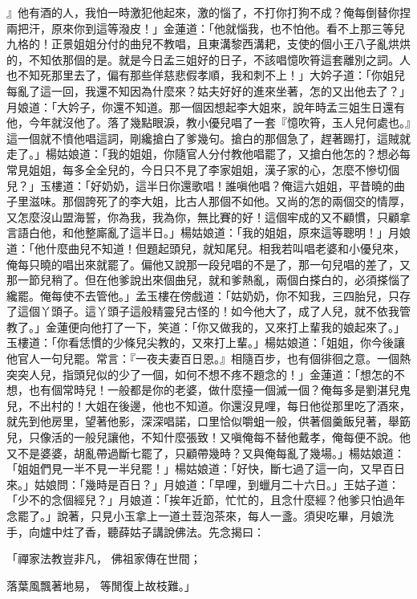 \begin{showcontents}{}
』他有酒的人，我怕一時激犯他起來，激的惱了，不打你打狗不成？俺每倒替你捏兩把汗，原來你到這等潑皮！」金蓮道：「他就惱我，也不怕他。看不上那三等兒九格的！正景姐姐分付的曲兒不教唱，且東溝黎西溝耙，支使的個小王八子亂烘烘的，不知依那個的是。就是今日孟三姐好的日子，不該唱憶吹筲這套離別之詞。人也不知死那里去了，偏有那些佯慈悲假孝順，我和刺不上！」大妗子道：「你姐兒每亂了這一回，我還不知因為什麼來？姑夫好好的進來坐著，怎的又出他去了？」月娘道：「大妗子，你還不知道。那一個因想起李大姐來，說年時孟三姐生日還有他，今年就沒他了。落了幾點眼淚，教小優兒唱了一套『憶吹筲，玉人兒何處也。』這一個就不憤他唱這詞，剛纔搶白了爹幾句。搶白的那個急了，趕著踢打，這賊就走了。」楊姑娘道：「我的姐姐，你隨官人分付教他唱罷了，又搶白他怎的？想必每常見姐姐，每多全全兒的，今日只不見了李家姐姐，漢子家的心，怎麼不慘切個兒？」玉樓道：「好奶奶，這半日你還歌唱！誰嗔他唱？俺這六姐姐，平昔曉的曲子里滋味。那個誇死了的李大姐，比古人那個不如他。又尚的怎的兩個交的情厚，又怎麼沒山盟海誓，你為我，我為你，無比賽的好！這個牢成的又不顧慣，只顧拿言語白他，和他整廝亂了這半日。」楊姑娘道：「我的姐姐，原來這等聰明！」月娘道：「他什麼曲兒不知道！但題起頭兒，就知尾兒。相我若叫唱老婆和小優兒來，俺每只曉的唱出來就罷了。偏他又說那一段兒唱的不是了，那一句兒唱的差了，又那一節兒稍了。但在他爹說出來個曲兒，就和爹熱亂，兩個白搽白的，必須搽惱了纔罷。俺每使不去管他。」孟玉樓在傍戲道：「姑奶奶，你不知我，三四胎兒，只存了這個丫頭子。這丫頭子這般精靈兒古怪的！如今他大了，成了人兒，就不依我管教了。」金蓮便向他打了一下，笑道：「你又做我的，又來打上輩我的娘起來了。」玉樓道：「你看恁慣的少條兒尖教的，又來打上輩。」楊姑娘道：「姐姐，你今後讓他官人一句兒罷。常言：『一夜夫妻百日恩。』相隨百步，也有個徘徊之意。一個熱突突人兒，指頭兒似的少了一個，如何不想不疼不題念的！」金蓮道：「想怎的不想，也有個常時兒！一般都是你的老婆，做什麼擡一個滅一個？俺每多是劉湛兒鬼兒，不出村的！大姐在後邊，他也不知道。你還沒見哩，每日他從那里吃了酒來，就先到他房里，望著他影，深深唱諾，口里恰似嚼蛆一般，供著個羹飯兒著，舉筯兒，只像活的一般兒讓他，不知什麼張致！又嗔俺每不替他戴孝，俺每便不說。他又不是婆婆，胡亂帶過斷七罷了，只顧帶幾時？又與俺每亂了幾場。」楊姑娘道：「姐姐們見一半不見一半兒罷！」楊姑娘道：「好快，斷七過了這一向，又早百日來。」姑娘問：「幾時是百日？」月娘道：「早哩，到蠟月二十六日。」王姑子道：「少不的念個經兒？」月娘道：「挨年近節，忙忙的，且念什麼經？他爹只怕過年念罷了。」說著，只見小玉拿上一道土荳泡茶來，每人一盞。須臾吃畢，月娘洗手，向爐中炷了香，聽薛姑子講說佛法。先念揭曰：

「禪家法教豈非凡，  佛祖家傳在世間；

落葉風飄著地易，  等閒復上故枝難。」


\end{showcontents}
